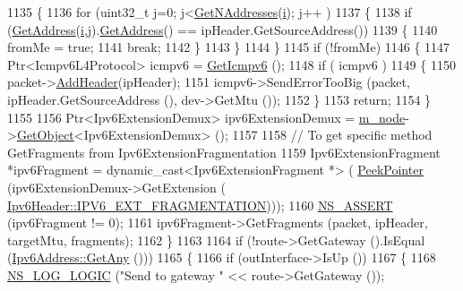 \begin{DoxyCode}
1135         \{
1136           \textcolor{keywordflow}{for} (uint32\_t j=0; j<\hyperlink{classns3_1_1Ipv6L3Protocol_a3b09a9f504a311ecc08fdc026d897514}{GetNAddresses}(\hyperlink{bernuolliDistribution_8m_a6f6ccfcf58b31cb6412107d9d5281426}{i}); j++ )
1137             \{
1138               \textcolor{keywordflow}{if} (\hyperlink{classns3_1_1Ipv6L3Protocol_a0321a9ac3f79b5a7b7542cecf11bfe44}{GetAddress}(\hyperlink{bernuolliDistribution_8m_a6f6ccfcf58b31cb6412107d9d5281426}{i},j).\hyperlink{classns3_1_1Ipv6InterfaceAddress_a80d4caacff72bddc3045a5929519e107}{GetAddress}() == ipHeader.GetSourceAddress())
1139                 \{
1140                   fromMe = \textcolor{keyword}{true};
1141                   \textcolor{keywordflow}{break};
1142                 \}
1143             \}
1144         \}
1145       \textcolor{keywordflow}{if} (!fromMe)
1146         \{
1147           Ptr<Icmpv6L4Protocol> icmpv6 = \hyperlink{classns3_1_1Ipv6L3Protocol_a10384a4dc85c61e65cf73b47ec9da90d}{GetIcmpv6} ();
1148           \textcolor{keywordflow}{if} ( icmpv6 )
1149             \{
1150               packet->\hyperlink{classns3_1_1Packet_a465108c595a0bc592095cbcab1832ed8}{AddHeader}(ipHeader);
1151               icmpv6->SendErrorTooBig (packet, ipHeader.GetSourceAddress (), dev->GetMtu ());
1152             \}
1153           \textcolor{keywordflow}{return};
1154         \}
1155 
1156       Ptr<Ipv6ExtensionDemux> ipv6ExtensionDemux = \hyperlink{classns3_1_1Ipv6L3Protocol_a543d8509395ee76de15d039ff1fce642}{m\_node}->\hyperlink{classns3_1_1Object_a13e18c00017096c8381eb651d5bd0783}{GetObject}<Ipv6ExtensionDemux> ();
1157 
1158       \textcolor{comment}{// To get specific method GetFragments from Ipv6ExtensionFragmentation}
1159       Ipv6ExtensionFragment *ipv6Fragment = \textcolor{keyword}{dynamic\_cast<}Ipv6ExtensionFragment *\textcolor{keyword}{>} (
      \hyperlink{namespacens3_af2a7557fe9afdd98d8f6f8f6e412cf5a}{PeekPointer} (ipv6ExtensionDemux->GetExtension (
      \hyperlink{classns3_1_1Ipv6Header_a226429221a066c5e3b1f260caf27d1e9a5839daf3fdfb16dfdc94a208ca6ebc5a}{Ipv6Header::IPV6\_EXT\_FRAGMENTATION})));
1160       \hyperlink{assert_8h_a6dccdb0de9b252f60088ce281c49d052}{NS\_ASSERT} (ipv6Fragment != 0);
1161       ipv6Fragment->GetFragments (packet, ipHeader, targetMtu, fragments);
1162     \}
1163 
1164   \textcolor{keywordflow}{if} (!route->GetGateway ().IsEqual (\hyperlink{classns3_1_1Ipv6Address_a2783e8badfc98c8b0a8508bba6e1b91e}{Ipv6Address::GetAny} ()))
1165     \{
1166       \textcolor{keywordflow}{if} (outInterface->IsUp ())
1167         \{
1168           \hyperlink{group__logging_ga88acd260151caf2db9c0fc84997f45ce}{NS\_LOG\_LOGIC} (\textcolor{stringliteral}{"Send to gateway "} << route->GetGateway ());

\end{DoxyCode}
